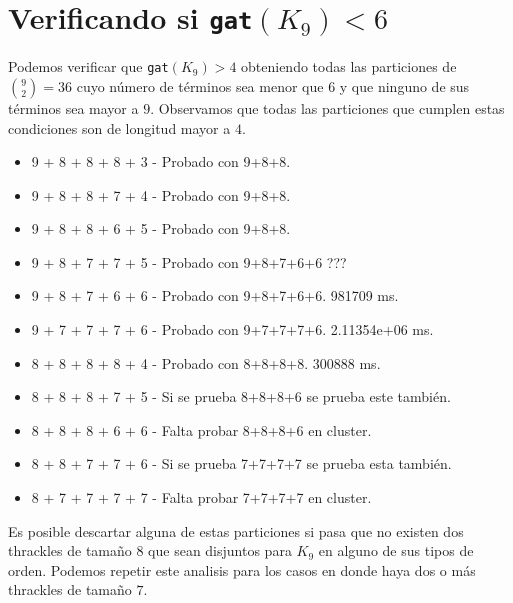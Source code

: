 \documentclass[12pt, letterpaper]{article}
\begin{document}
\section{Verificando si \texttt{gat}$(K_9) < 6$}
Podemos verificar que \texttt{gat}$(K_9) > 4$ obteniendo todas las particiones de $\binom{9}{2} = 36$ cuyo
número de términos sea menor que $6$ y que ninguno de sus términos sea mayor a $9$.
Observamos que todas las particiones que cumplen estas condiciones son de longitud mayor a $4$.
\begin{itemize}
  \item 9 + 8 + 8 + 8 + 3 - Probado con 9+8+8.
  \item 9 + 8 + 8 + 7 + 4 - Probado con 9+8+8.
  \item 9 + 8 + 8 + 6 + 5 - Probado con 9+8+8.
  \item 9 + 8 + 7 + 7 + 5 - Probado con 9+8+7+6+6 ???
  \item 9 + 8 + 7 + 6 + 6 - Probado con 9+8+7+6+6. 981709 ms.
  \item 9 + 7 + 7 + 7 + 6 - Probado con 9+7+7+7+6. 2.11354e+06 ms.
  \item 8 + 8 + 8 + 8 + 4 - Probado con 8+8+8+8. 300888 ms.
  \item 8 + 8 + 8 + 7 + 5 - Si se prueba 8+8+8+6 se prueba este también.
  \item 8 + 8 + 8 + 6 + 6 - Falta probar 8+8+8+6 en cluster.
  \item 8 + 8 + 7 + 7 + 6 - Si se prueba 7+7+7+7 se prueba esta también.
  \item 8 + 7 + 7 + 7 + 7 - Falta probar 7+7+7+7 en cluster.
\end{itemize}

Es posible descartar alguna de estas particiones si pasa que no existen dos thrackles de tamaño $8$ que sean disjuntos
para $K_9$ en alguno de sus tipos de orden. Podemos repetir este analisis para los casos en donde haya dos o más thrackles
de tamaño $7$.
\end{document}
